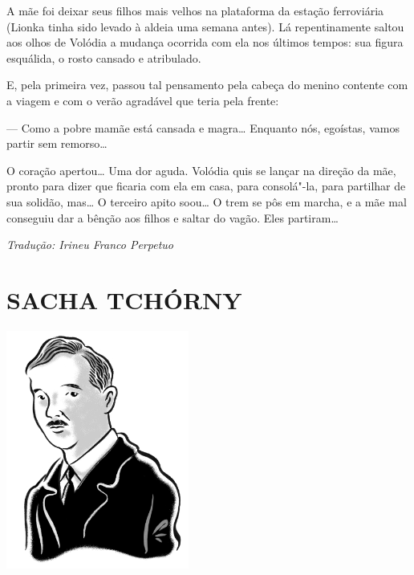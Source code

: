 
A mãe foi deixar seus filhos mais velhos na plataforma da estação
ferroviária (Lionka tinha sido levado à aldeia uma semana antes). Lá
repentinamente saltou aos olhos de Volódia a mudança ocorrida com ela
nos últimos tempos: sua figura esquálida, o rosto cansado e atribulado.

E, pela primeira vez, passou tal pensamento pela cabeça do menino
contente com a viagem e com o verão agradável que teria pela frente:

--- Como a pobre mamãe está cansada e magra\ldots{} Enquanto nós, egoístas,
vamos partir sem remorso\ldots{}

O coração apertou\ldots{} Uma dor aguda. Volódia quis se lançar na direção da
mãe, pronto para dizer que ficaria com ela em casa, para consolá"-la,
para partilhar de sua solidão, mas\ldots{} O terceiro apito soou\ldots{} O trem se
pôs em marcha, e a mãe mal conseguiu dar a bênção aos filhos e saltar do
vagão. Eles partiram\ldots{}\enlargethispage{\baselineskip}


{\footnotesize\hfill\emph{Tradução: Irineu Franco Perpetuo}}


\part[SACHA TCHÓRNY]{SACHA TCHÓRNY }

\pagebreak
\thispagestyle{empty}
\mbox{}
\vfill
\begin{center}
\includegraphics[width=6cm]{./imgs/autor11.jpg}
\end{center}

